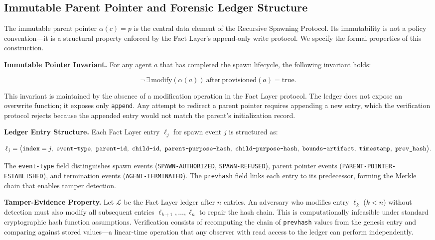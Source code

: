 \subsection{Immutable Parent Pointer and Forensic Ledger Structure}

The immutable parent pointer $\alpha(c) = p$ is the central data element of the Recursive Spawning Protocol. Its immutability is not a policy convention—it is a structural property enforced by the Fact Layer's append-only write protocol. We specify the formal properties of this construction.

\medskip
\noindent\textbf{Immutable Pointer Invariant.} For any agent $a$ that has completed the spawn lifecycle, the following invariant holds:

\begin{equation}
\neg\,\exists\,\mathrm{modify}(\alpha(a))\ \text{after}\ \mathrm{provisioned}(a) = \mathrm{true}.
\label{eq:immutable-pointer-invariant}
\end{equation}

This invariant is maintained by the absence of a modification operation in the Fact Layer protocol. The ledger does not expose an overwrite function; it exposes only \texttt{append}. Any attempt to redirect a parent pointer requires appending a new entry, which the verification protocol rejects because the appended entry would not match the parent's initialization record.

\medskip
\noindent\textbf{Ledger Entry Structure.} Each Fact Layer entry $\ell_j$ for spawn event $j$ is structured as:

\begin{equation}
\ell_j = \bigl\langle
  \texttt{index}=j,\
  \texttt{event-type},\
  \texttt{parent-id},\
  \texttt{child-id},\
  \texttt{parent-purpose-hash},\
  \texttt{child-purpose-hash},\
  \texttt{bounds-artifact},\
  \texttt{timestamp},\
  \texttt{prev\text{\textunderscore}hash}
\bigr\rangle .
\label{eq:spawn-ledger-entry}
\end{equation}

The \texttt{event-type} field distinguishes spawn events (\texttt{SPAWN-AUTHORIZED}, \texttt{SPAWN-REFUSED}), parent pointer events (\texttt{PARENT-POINTER-ESTABLISHED}), and termination events (\texttt{AGENT-TERMINATED}). The \texttt{prev\text{\textunderscore}hash} field links each entry to its predecessor, forming the Merkle chain that enables tamper detection.

\medskip
\noindent\textbf{Tamper-Evidence Property.} Let $\mathcal{L}$ be the Fact Layer ledger after $n$ entries. An adversary who modifies entry $\ell_k$ ($k < n$) without detection must also modify all subsequent entries $\ell_{k+1}, \ldots, \ell_n$ to repair the hash chain. This is computationally infeasible under standard cryptographic hash function assumptions. Verification consists of recomputing the chain of \texttt{prev\text{\textunderscore}hash} values from the genesis entry and comparing against stored values—a linear-time operation that any observer with read access to the ledger can perform independently.


